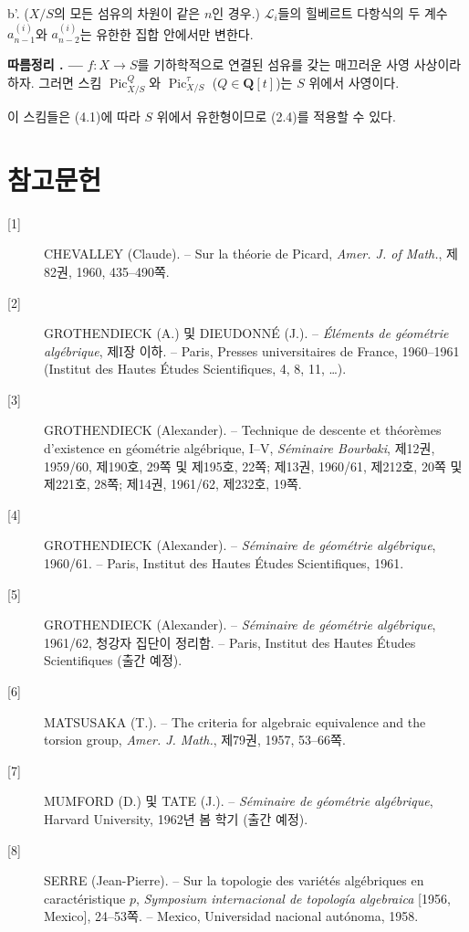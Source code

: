 \documentclass[11pt,twoside,openany]{book}
\numberwithin{equation}{section}
\newcommand{\sourceunit}{front}
\newcommand{\src}[1]{%
  \phantomsection\hypertarget{src:\sourceunit:#1}{}%
  \marginpar{\raggedleft\footnotesize\sffamily #1}%
}
\theoremstyle{plain}
\theoremstyle{definition}
\theoremstyle{remark}
\newcommand{\result}[2]{%
  \par\medskip\noindent\textbf{#1%
  \if\relax\detokenize{#2}\relax\else\space#2\fi. ---}\enspace
}
\begin{document}
\noindent b'. ($X/S$의 모든 섬유의 차원이 같은 $n$인 경우.)
$\mathcal L_i$들의 힐베르트 다항식의 두 계수 $a_{n-1}^{(i)}$와
$a_{n-2}^{(i)}$는 유한한 집합 안에서만 변한다.

\src{243}

\result{따름정리}{4.2} $f:X\longrightarrow S$를 기하학적으로 연결된 섬유를
갖는 매끄러운 사영 사상이라 하자. 그러면 스킴
$\operatorname{Pic}_{X/S}^Q$와 $\operatorname{Pic}_{X/S}^\tau$
($Q\in\mathbf Q[t]$)는 $S$ 위에서 사영이다.

이 스킴들은 (4.1)에 따라 $S$ 위에서 유한형이므로 (2.4)를 적용할 수 있다.

\section*{참고문헌}

\begin{description}
\item[{[1]}] CHEVALLEY (Claude). -- Sur la théorie de Picard,
\emph{Amer. J. of Math.}, 제82권, 1960, 435--490쪽.

\item[{[2]}] GROTHENDIECK (A.) 및 DIEUDONNÉ (J.). -- \emph{Éléments de
géométrie algébrique}, 제I장 이하. -- Paris, Presses universitaires de France,
1960--1961 (Institut des Hautes Études Scientifiques, 4, 8, 11, \ldots).

\item[{[3]}] GROTHENDIECK (Alexander). -- Technique de descente et théorèmes
d'existence en géométrie algébrique, I--V, \emph{Séminaire Bourbaki}, 제12권,
1959/60, 제190호, 29쪽 및 제195호, 22쪽; 제13권, 1960/61, 제212호, 20쪽 및
제221호, 28쪽; 제14권, 1961/62, 제232호, 19쪽.

\item[{[4]}] GROTHENDIECK (Alexander). -- \emph{Séminaire de géométrie
algébrique}, 1960/61. -- Paris, Institut des Hautes Études Scientifiques, 1961.

\item[{[5]}] GROTHENDIECK (Alexander). -- \emph{Séminaire de géométrie
algébrique}, 1961/62, 청강자 집단이 정리함. -- Paris, Institut des Hautes
Études Scientifiques (출간 예정).

\item[{[6]}] MATSUSAKA (T.). -- The criteria for algebraic equivalence and the
torsion group, \emph{Amer. J. Math.}, 제79권, 1957, 53--66쪽.

\item[{[7]}] MUMFORD (D.) 및 TATE (J.). -- \emph{Séminaire de géométrie
algébrique}, Harvard University, 1962년 봄 학기 (출간 예정).

\item[{[8]}] SERRE (Jean-Pierre). -- Sur la topologie des variétés algébriques
en caractéristique $p$, \emph{Symposium internacional de topología algebraica}
[1956, Mexico], 24--53쪽. -- Mexico, Universidad nacional autónoma, 1958.
\end{description}
\end{document}

